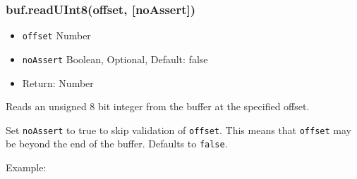 \begin{Shaded}
\begin{Highlighting}[]
  \NormalTok{);}

 \NormalTok{(}   
  \NormalTok{; }
\NormalTok{\}}

 \NormalTok{(}\NormalTok{, }\NormalTok{);}
\NormalTok{(}\NormalTok{(}\NormalTok{, }\NormalTok{, }\NormalTok{));}
\NormalTok{buf1[}\NormalTok{] = }\NormalTok{;}
\NormalTok{(}\NormalTok{(}\NormalTok{, }\NormalTok{, }\NormalTok{));}

\end{Highlighting}
\end{Shaded}

\subsubsection{buf.readUInt8(offset, {[}noAssert{]})}

\begin{itemize}
\item
  \texttt{offset} Number
\item
  \texttt{noAssert} Boolean, Optional, Default: false
\item
  Return: Number
\end{itemize}

Reads an unsigned 8 bit integer from the buffer at the specified offset.

Set \texttt{noAssert} to true to skip validation of \texttt{offset}.
This means that \texttt{offset} may be beyond the end of the buffer.
Defaults to \texttt{false}.

Example:


